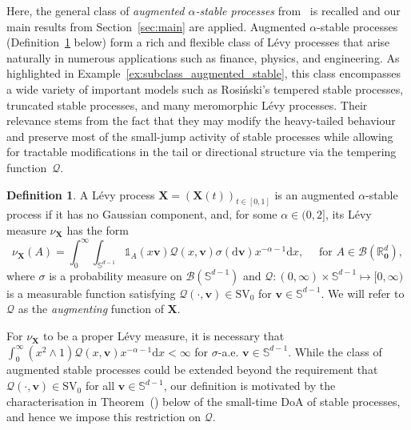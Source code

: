 \documentclass[en,oneside,bbfont,article]{amsart}
\theoremstyle{remark}
\theoremstyle{definition}
\theoremstyle{definition}
\newtheorem{defin}[theorem]{Definition}
\newcommand\calQ{\mathcal{Q}}
\newcommand\Sp{\mathbb{S}}
\newcommand{\mW}{\mathcal{W}}
\newcommand\R{\mathbb{R}}
\newcommand\1{\mathds{1}}
\newcommand\SV{\mathrm{SV}}
\newcommand{\D}{\mathrm{d}}
\begin{document}
Here, the general class of \emph{augmented $\alpha$-stable processes} from~\cite[Sec.~2.5]{WassersteinPaper} is recalled and our main results from Section~\ref{sec:main} are applied. Augmented $\alpha$-stable processes (Definition~\ref{def:augmented-stable} below) form a rich and flexible class of L\'evy processes that arise naturally in numerous applications such as finance, physics, and engineering. As highlighted in Example~\ref{ex:subclass_augmented_stable}, this class encompasses a wide variety of important models such as Rosi\'nski's tempered stable processes, truncated stable processes, and many meromorphic L\'evy processes. Their relevance stems from the fact that they may modify the heavy-tailed behaviour and preserve most of the small-jump activity of stable processes while allowing for tractable modifications in the tail or directional structure via the tempering function~$\calQ$. %

\begin{defin}
\label{def:augmented-stable}    
A L\'evy process $\bm{X}=(\bm{X}(t))_{t \in [0,1]}$ is an augmented $\alpha$-stable process if it has no Gaussian component, and, for some $\alpha\in(0,2]$, its L\'evy measure $\nu_{\bm{X}}$ has the form
\begin{equation} \label{eq:temp_stab_alpha}
\nu_{\bm{X}}(A)
= \int_0^\infty\int_{\Sp^{d-1}}  \1_{A}(x\bm{v}) \calQ(x,\bm{v})  \sigma(\D \bm{v})x^{-\alpha-1}\D x, \quad \text{ for } A \in \mathcal{B}(\R^d_{\bm{0}}),
\end{equation}
where $\sigma$ is a probability measure on $\mathcal{B}(\Sp^{d-1})$ and $\calQ:(0,\infty)\times \Sp^{d-1} \mapsto [0,\infty)$ is a measurable function satisfying $\calQ(\cdot,\bm{v})\in\SV_0$ for $\bm{v}\in\Sp^{d-1}$. We will refer to $\calQ$ as the \emph{augmenting} function of $\bm{X}$.
\end{defin}


For $\nu_{\bm{X}}$ to be a proper L\'evy measure, it is necessary that $\int_0^\infty (x^2\wedge 1)\calQ(x,\bm{v})x^{-\alpha-1}\D x<\infty$ for $\sigma$-a.e. $\bm{v}\in\Sp^{d-1}$. While the class of augmented stable processes could be extended beyond the requirement that $\calQ(\cdot,\bm{v})\in\SV_0$ for all $\bm{v}\in\Sp^{d-1}$, our definition is motivated by the characterisation in Theorem~() below of the small-time DoA of stable processes, and hence we impose this restriction on $\calQ$. 
\end{document}
